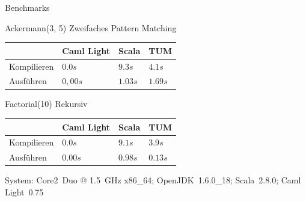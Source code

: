 \documentclass[hyperref={pdfpagelabels=false}]{beamer}
\begin{document}
\begin{frame}{Benchmarks}
  \begin{block}{Ackermann(3, 5)}
    Zweifaches Pattern Matching

    \begin{tabular}{l|l|l|l}
       & Caml Light & Scala & TUM \\
      \hline
      Kompilieren & \textcolor{fastest}{$0.0s$} & \textcolor{slowest}{$9.3s$} & $4.1s$ \\
      Ausführen & \textcolor{fastest}{$0,00s$} & $1.03s$ & \textcolor{slowest}{$1.69s$} \\
    \end{tabular}
  \end{block}
  \begin{block}{Factorial(10)}
    Rekursiv

    \begin{tabular}{l|l|l|l}
       & Caml Light & Scala & TUM \\
      \hline
      Kompilieren & \textcolor{fastest}{$0.0s$} & \textcolor{slowest}{$9.1s$} & $3.9s$ \\
      Ausführen & \textcolor{fastest}{$0.00s$} & \textcolor{slowest}{$0.98s$} & $0.13s$ \\
    \end{tabular}
  \end{block}
  System: Core2~Duo @ 1.5~GHz x86\_64; OpenJDK~1.6.0\_18; Scala~2.8.0; Caml Light~0.75
\end{frame}
\end{document}
